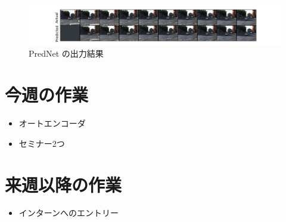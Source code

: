 
\begin{figure}[hb]
\begin{center}
\includegraphics[scale=0.8]{plot_1.png}
\caption{PredNet の出力結果}
\end{center}
\end{figure}


\section{今週の作業}
\begin{itemize}       
         \item オートエンコーダ
         \item セミナー2つ
\end{itemize}

\section{来週以降の作業}
\begin{itemize}
         \item インターンへのエントリー
\end{itemize}





